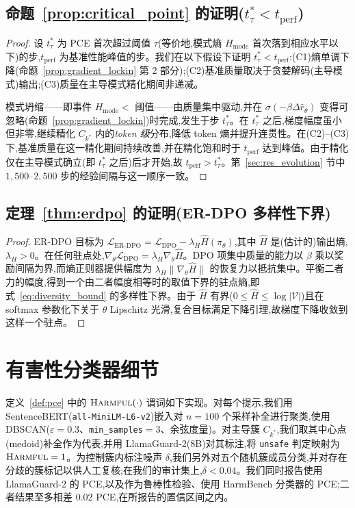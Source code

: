 \subsection{命题~\ref{prop:critical_point} 的证明($t^*_\tau < t_{\text{perf}}$)}

\begin{proof}
设 $t^*_\tau$ 为 PCE 首次超过阈值 $\tau$(等价地,模式熵 $H_{\text{mode}}$ 首次落到相应水平以下)的步,$t_{\text{perf}}$ 为基准性能峰值的步。我们在以下假设下证明 $t^*_\tau < t_{\text{perf}}$:(C1)熵单调下降(命题~\ref{prop:gradient_lockin} 第 2 部分);(C2)基准质量取决于贪婪解码(主导模式)输出;(C3)质量在主导模式精化期间非递减。

模式坍缩——即事件 $H_{\text{mode}} < $ 阈值——由质量集中驱动,并在 $\sigma(-\beta\Delta\hat{r}_\theta)$ 变得可忽略(命题~\ref{prop:gradient_lockin})时完成,发生于步 $t^*_\tau$。在 $t^*_\tau$ 之后,梯度幅度虽小但非零,继续精化 $C_{k^*}$ 内的\emph{token 级}分布,降低 token 熵并提升连贯性。在(C2)--(C3)下,基准质量在这一精化期间持续改善,并在精化饱和时于 $t_{\text{perf}}$ 达到峰值。由于精化仅在主导模式确立(即 $t^*_\tau$ 之后)后才开始,故 $t_{\text{perf}} > t^*_\tau$。第~\ref{sec:res_evolution} 节中 $1{,}500$--$2{,}500$ 步的经验间隔与这一顺序一致。
\end{proof}

\subsection{定理~\ref{thm:erdpo} 的证明(ER-DPO 多样性下界)}

\begin{proof}
ER-DPO 目标为 $\mathcal{L}_{\text{ER-DPO}} = \mathcal{L}_{\text{DPO}} - \lambda_H \hat{H}(\pi_\theta)$,其中 $\hat{H}$ 是(估计的)输出熵,$\lambda_H>0$。在任何驻点处,$\nabla_\theta \mathcal{L}_{\text{DPO}} = \lambda_H \nabla_\theta \hat{H}$。DPO 项集中质量的能力以 $\beta$ 乘以奖励间隔为界,而熵正则器提供幅度为 $\lambda_H \|\nabla_\theta \hat{H}\|$ 的恢复力以抵抗集中。平衡二者力的幅度,得到一个由二者幅度相等时的取值下界的驻点熵,即式~\eqref{eq:diversity_bound} 的多样性下界。由于 $\hat{H}$ 有界($0\leq \hat{H}\leq \log|\mathcal{V}|$)且在 softmax 参数化下关于 $\theta$ Lipschitz 光滑,复合目标满足下降引理,故梯度下降收敛到这样一个驻点。
\end{proof}

\section{有害性分类器细节}
\label{app:harmful_classifier}

定义~\ref{def:pce} 中的 $\textsc{Harmful}(\cdot)$ 谓词如下实现。对每个提示,我们用 SentenceBERT(\texttt{all-MiniLM-L6-v2})嵌入对 $n=100$ 个采样补全进行聚类,使用 DBSCAN($\varepsilon=0.3$、\texttt{min\_samples}$=3$、余弦度量)。对主导簇 $C_{k^*}$,我们取其中心点(medoid)补全作为代表,并用 LlamaGuard-2(8B)对其标注,将 \texttt{unsafe} 判定映射为 $\textsc{Harmful}=1$。为控制簇内标注噪声 $\delta$,我们另外对五个随机簇成员分类,并对存在分歧的簇标记以供人工复核;在我们的审计集上,$\delta < 0.04$。我们同时报告使用 LlamaGuard-2 的 PCE,以及作为鲁棒性检验、使用 HarmBench 分类器的 PCE;二者结果至多相差 0.02 PCE,在所报告的置信区间之内。
